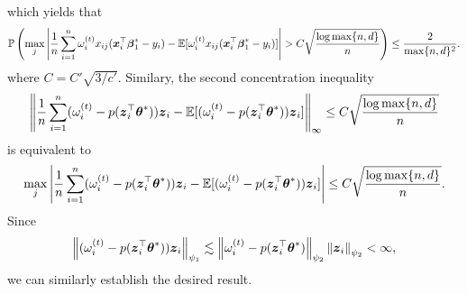 
which yields that 
\begin{equation*}
\mathbb{P}\left( \max_j\left\lvert \frac{1}{n}\sum_{i=1}^n \omega_i^{(t)} x_{ij} ( \boldsymbol{x}_i^\top \boldsymbol{\beta}_1^* - y_i) 
- \mathbb{E}[ \omega_i^{(t)} x_{ij} ( \boldsymbol{x}_i^\top \boldsymbol{\beta}_1^* - y_i) ] \right\rvert > C\sqrt{\frac{ \log \max\{n, d\}}{n}}  \right) \le \frac{2}{\max\{n, d\}^2}. 
\end{equation*}
where $C=C'\sqrt{3/c'}$.
Similary, the second concentration inequality
\begin{equation*}
\left\lVert  \frac{1}{n}\sum_{i=1}^n ( \omega_i^{(t)} - p(\boldsymbol{z}_i^\top\boldsymbol{\theta}^{*}) ) \boldsymbol{z}_i 
- \mathbb{E}[ (\omega_i^{(t)} - p(\boldsymbol{z}_i^\top\boldsymbol{\theta}^{*}) ) \boldsymbol{z}_i ] \right\rVert_\infty \le C \sqrt{ \frac{\log \max\{n, d\}}{n} }
\end{equation*}
is equivalent to 
\begin{equation*}
\max_j \left\lvert  \frac{1}{n}\sum_{i=1}^n ( \omega_i^{(t)} - p(\boldsymbol{z}_i^\top\boldsymbol{\theta}^{*}) ) \boldsymbol{z}_i 
- \mathbb{E}[ (\omega_i^{(t)} - p(\boldsymbol{z}_i^\top\boldsymbol{\theta}^{*}) ) \boldsymbol{z}_i ] \right\rvert \le C \sqrt{ \frac{\log \max\{n, d\}}{n} }.
\end{equation*}
Since 
\begin{equation*}
\left\lVert( \omega_i^{(t)} - p(\boldsymbol{z}_i^\top\boldsymbol{\theta}^{*}) ) \boldsymbol{z}_i \right\rVert_{\psi_1} \lesssim \left\lVert \omega_i^{(t)} - p(\boldsymbol{z}_i^\top\boldsymbol{\theta}^{*})\right\rVert_{\psi_2} \left\lVert\boldsymbol{z}_i \right\rVert_{\psi_2}  < \infty,
\end{equation*}
we can similarly establish the desired result. 



